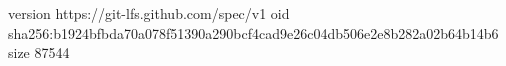 version https://git-lfs.github.com/spec/v1
oid sha256:b1924bfbda70a078f51390a290bcf4cad9e26c04db506e2e8b282a02b64b14b6
size 87544
